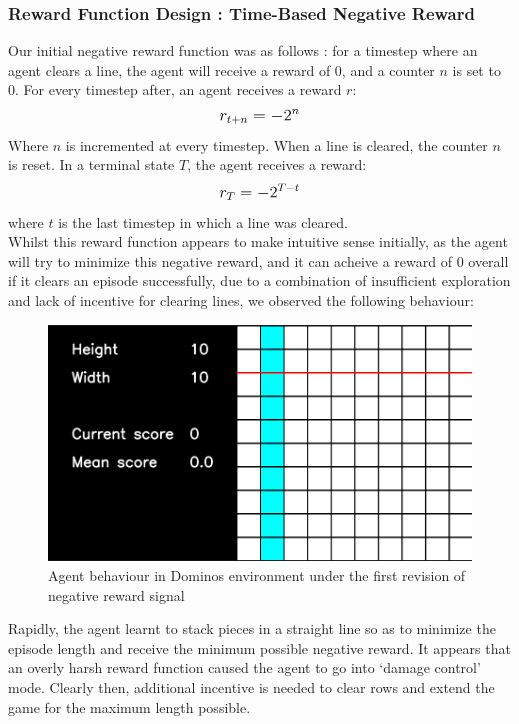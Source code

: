 \documentclass[12pt]{article}
\begin{document}
\subsubsection{Reward Function Design : Time-Based Negative Reward}\label{negative}
Our initial negative reward function was as follows : for a timestep where an agent clears a line, the agent will receive a reward of 0, and a counter $n$ is set to 0. For every timestep after, an agent receives a reward $r$: 
\begin{equation}
    \mathlarger{
        r_{t+n} = -2^{n}
    }
\end{equation}
Where $n$ is incremented at every timestep. When a line is cleared, the counter $n$ is reset. In a terminal state $T$, the agent receives a reward: 
\begin{equation}
    \mathlarger{
        r_T = -2^{T-t}
    }
\end{equation}
where $t$ is the last timestep in which a line was cleared. \\\newline
Whilst this reward function appears to make intuitive sense initially, as the agent will try to minimize this negative reward, and it can acheive a reward of 0 overall if it clears an episode successfully, due to a combination of insufficient exploration and lack of incentive for clearing lines, we observed the following behaviour: 
\begin{figure}[H]
    \centering
    \includegraphics[scale=0.4]{21.png}
    \caption{Agent behaviour in Dominos environment under the first revision of negative reward signal}
\end{figure}
Rapidly, the agent learnt to stack pieces in a straight line so as to minimize the episode length and receive the minimum possible negative reward. It appears that an overly harsh reward function caused the agent to go into `damage control' mode. Clearly then, additional incentive is needed to clear rows and extend the game for the maximum length possible. \\\newline
\end{document}
